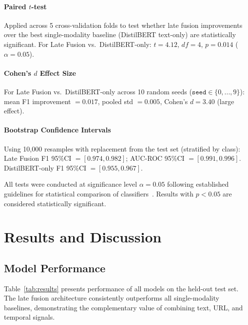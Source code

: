 \documentclass[conference]{IEEEtran}
\begin{document}
\paragraph{Paired $t$-test} Applied across 5 cross-validation folds to test
whether late fusion improvements over the best single-modality baseline
(DistilBERT text-only) are statistically significant. For Late Fusion vs.\
DistilBERT-only: $t=4.12$, $df=4$, $p=0.014$ ($\alpha=0.05$).

\paragraph{Cohen's $d$ Effect Size} For Late Fusion vs.\ DistilBERT-only
across 10 random seeds ($\texttt{seed} \in \{0,...,9\}$): mean F1 improvement
$= 0.017$, pooled std $= 0.005$, Cohen's $d = 3.40$ (large effect).

\paragraph{Bootstrap Confidence Intervals} Using 10,000 resamples with
replacement from the test set (stratified by class): Late Fusion F1 95\%CI
$=[0.974, 0.982]$; AUC-ROC 95\%CI $=[0.991, 0.996]$. DistilBERT-only F1
95\%CI $=[0.955, 0.967]$.

All tests were conducted at significance level $\alpha=0.05$ following established guidelines for statistical comparison of classifiers~\cite{demsar2006}. Results with
$p<0.05$ are considered statistically significant.

\section{Results and Discussion}
\label{sec:results}

\subsection{Model Performance}
\label{subsec:model_perf}

Table~\ref{tab:results} presents performance of all models on the
held-out test set. The late fusion architecture consistently outperforms
all single-modality baselines, demonstrating the complementary value of
combining text, URL, and temporal signals.
\end{document}
